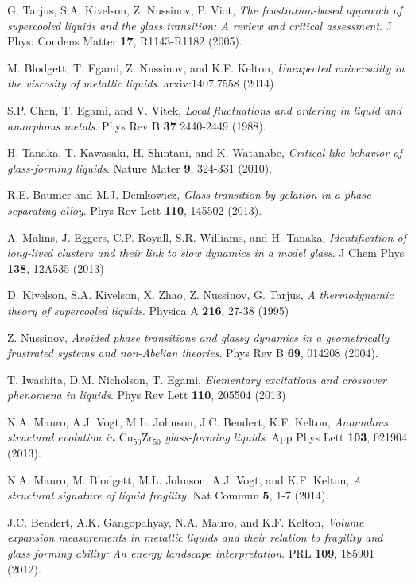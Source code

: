 \documentclass[aps,prl,preprint,showpacs,amsmath,floatfix,superscriptaddress]{revtex4}
\begin{document}
\begin{thebibliography}{}
G. Tarjus, S.A. Kivelson, Z. Nussinov, P. Viot, \textit{The frustration-based approach of supercooled liquids and the glass transition: A review and critical assessment}. J Phys: Condens Matter \textbf{17}, R1143-R1182 (2005).

M. Blodgett, T. Egami, Z. Nussinov, and K.F. Kelton, \textit{Unexpected universality in the viscosity of metallic liquids}. arxiv:1407.7558 (2014)

S.P. Chen, T. Egami, and V. Vitek, \textit{Local fluctuations and ordering in liquid and amorphous metals}. Phys Rev B \textbf{37} 2440-2449 (1988).

H. Tanaka, T. Kawasaki, H. Shintani, and K. Watanabe, \textit{Critical-like behavior of glass-forming liquids}. Nature Mater \textbf{9}, 324-331 (2010).

R.E. Baumer and M.J. Demkowicz, \textit{Glass transition by gelation in a phase separating alloy}. Phys Rev Lett \textbf{110}, 145502 (2013).

A. Malins, J. Eggers, C.P. Royall, S.R. Williams, and H. Tanaka, \textit{Identification of long-lived clusters and their link to slow dynamics in a model glass}. J Chem Phys \textbf{138}, 12A535 (2013)

D. Kivelson, S.A. Kivelson, X. Zhao, Z. Nussinov, G. Tarjus, \textit{A thermodynamic  theory of supercooled liquids}. Physica A \textbf{216}, 27-38 (1995)

Z. Nussinov, \textit{Avoided phase transitions and glassy dynamics in a geometrically frustrated systems and non-Abelian theories}. Phys Rev B \textbf{69}, 014208 (2004).

T. Iwashita, D.M. Nicholson, T. Egami, \textit{Elementary excitations and crossover phenomena in liquids}. Phys Rev Lett \textbf{110}, 205504 (2013)

N.A. Mauro, A.J. Vogt, M.L. Johnson, J.C. Bendert, K.F. Kelton, \textit{Anomalous structural evolution in $\mathrm{Cu_{50}Zr_{50}}$ glass-forming liquids}. App Phys Lett \textbf{103}, 021904 (2013).

N.A. Mauro, M. Blodgett, M.L. Johnson, A.J. Vogt, and K.F. Kelton, \textit{A structural signature of liquid fragility}. Nat Commun \textbf{5}, 1-7 (2014).

J.C. Bendert, A.K. Gangopahyay, N.A. Mauro, and K.F. Kelton, \textit{Volume expansion measurements in metallic liquids and their relation to fragility and glass forming ability: An energy landscape interpretation}. PRL \textbf{109}, 185901 (2012).


\end{thebibliography}
\end{document}
